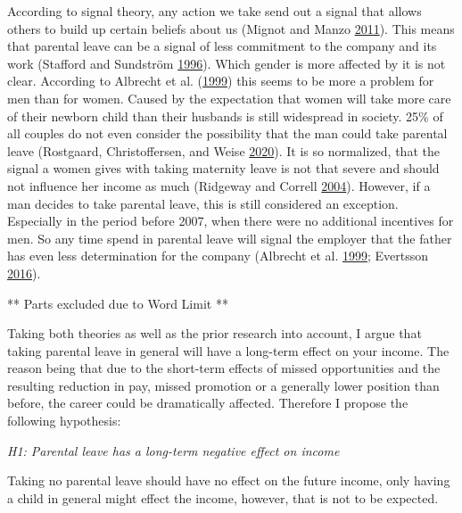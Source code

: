 \documentclass[
  11pt,
]{article}
\begin{document}
According to signal theory, any action we take send out a signal that allows others to build up certain beliefs about us (Mignot and Manzo \protect\hyperlink{ref-mignot_peter_2011}{2011}). This means that parental leave can be a signal of less commitment to the company and its work (Stafford and Sundström \protect\hyperlink{ref-stafford_time_1996}{1996}). Which gender is more affected by it is not clear. According to Albrecht et al. (\protect\hyperlink{ref-albrecht_career_1999}{1999}) this seems to be more a problem for men than for women. Caused by the expectation that women will take more care of their newborn child than their husbands is still widespread in society. 25\% of all couples do not even consider the possibility that the man could take parental leave (Rostgaard, Christoffersen, and Weise \protect\hyperlink{ref-rostgaard_parental_2020}{2020}). It is so normalized, that the signal a women gives with taking maternity leave is not that severe and should not influence her income as much (Ridgeway and Correll \protect\hyperlink{ref-ridgeway_unpacking_2004}{2004}). However, if a man decides to take parental leave, this is still considered an exception. Especially in the period before 2007, when there were no additional incentives for men. So any time spend in parental leave will signal the employer that the father has even less determination for the company (Albrecht et al. \protect\hyperlink{ref-albrecht_career_1999}{1999}; Evertsson \protect\hyperlink{ref-evertsson_parental_2016}{2016}).

** Parts excluded due to Word Limit **

Taking both theories as well as the prior research into account, I argue that taking parental leave in general will have a long-term effect on your income. The reason being that due to the short-term effects of missed opportunities and the resulting reduction in pay, missed promotion or a generally lower position than before, the career could be dramatically affected.
Therefore I propose the following hypothesis:

\emph{H1: Parental leave has a long-term negative effect on income}

Taking no parental leave should have no effect on the future income, only having a child in general might effect the income, however, that is not to be expected.
\end{document}
